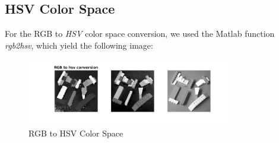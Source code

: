 \documentclass[11pt]{article}
\begin{document}
\subsection{HSV Color Space}
For the RGB to \textit{HSV} color space conversion, we used the Matlab function \textit{rgb2hsv}, which yield the following image:

\begin{figure}[H]
    \centering
    \includegraphics[width=0.8\textwidth]{bricks_to_hsv.jpg}
    \caption{RGB to HSV Color Space}
    \label{fig:hsv_color}
\end{figure}
\end{document}
